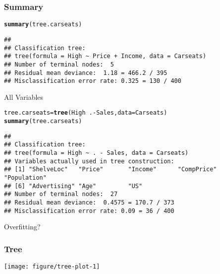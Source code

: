 \documentclass[handout]{beamer}\usepackage[]{graphicx}\usepackage[]{color}
\makeatletter
\def\maxwidth{ %
  \ifdim\Gin@nat@width>\linewidth
    \linewidth
  \else
    \Gin@nat@width
  \fi
}
\newcommand{\hlopt}[1]{\textcolor[rgb]{0,0,0}{#1}}%
\newcommand{\hlstd}[1]{\textcolor[rgb]{0.345,0.345,0.345}{#1}}%
\newcommand{\hlkwb}[1]{\textcolor[rgb]{0.69,0.353,0.396}{#1}}%
\newcommand{\hlkwc}[1]{\textcolor[rgb]{0.333,0.667,0.333}{#1}}%
\newcommand{\hlkwd}[1]{\textcolor[rgb]{0.737,0.353,0.396}{\textbf{#1}}}%
\newenvironment{kframe}{%
 \def\at@end@of@kframe{}%
 \ifinner\ifhmode%
  \def\at@end@of@kframe{\end{minipage}}%
  \begin{minipage}{\columnwidth}%
 \fi\fi%
 \def\FrameCommand##1{\hskip\@totalleftmargin \hskip-\fboxsep
 \colorbox{shadecolor}{##1}\hskip-\fboxsep
     \hskip-\linewidth \hskip-\@totalleftmargin \hskip\columnwidth}%
 \MakeFramed {\advance\hsize-\width
   \@totalleftmargin\z@ \linewidth\hsize
   \@setminipage}}%
 {\par\unskip\endMakeFramed%
 \at@end@of@kframe}
\newenvironment{knitrout}{}{} %
\makeatother
\begin{document}
\begin{frame}[fragile]\frametitle{Summary}
\begin{knitrout}
\color{fgcolor}\begin{kframe}
\begin{alltt}
 \hlkwd{summary}\hlstd{(tree.carseats)}
\end{alltt}
\begin{verbatim}
## 
## Classification tree:
## tree(formula = High ~ Price + Income, data = Carseats)
## Number of terminal nodes:  5 
## Residual mean deviance:  1.18 = 466.2 / 395 
## Misclassification error rate: 0.325 = 130 / 400
\end{verbatim}
\end{kframe}
\end{knitrout}
\end{frame}


\begin{frame}[fragile]{All Variables}

\begin{knitrout}
\color{fgcolor}\begin{kframe}
\begin{alltt}
\hlstd{tree.carseats} \hlkwb{=}\hlkwd{tree}\hlstd{(High} \hlopt{~}  \hlstd{.} \hlopt{-}\hlstd{Sales,} \hlkwc{data}\hlstd{=Carseats )}
\hlkwd{summary}\hlstd{(tree.carseats)}
\end{alltt}
\begin{verbatim}
## 
## Classification tree:
## tree(formula = High ~ . - Sales, data = Carseats)
## Variables actually used in tree construction:
## [1] "ShelveLoc"   "Price"       "Income"      "CompPrice"   "Population" 
## [6] "Advertising" "Age"         "US"         
## Number of terminal nodes:  27 
## Residual mean deviance:  0.4575 = 170.7 / 373 
## Misclassification error rate: 0.09 = 36 / 400
\end{verbatim}
\end{kframe}
\end{knitrout}

Overfitting?
\end{frame}

\begin{frame}\frametitle{Tree}
\vspace{-.5in}
\begin{knitrout}
\color{fgcolor}

{\centering \texttt{[image: figure/tree-plot-1]} 

}



\end{knitrout}

\end{frame}
\end{document}

